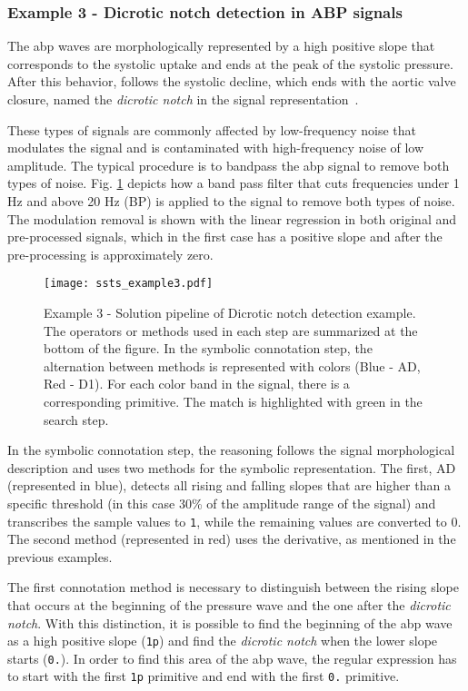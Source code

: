 \subsubsection{Example 3 - Dicrotic notch detection in ABP signals}

The \gls{abp} waves are morphologically represented by a high positive slope that corresponds to the systolic uptake and ends at the peak of the systolic pressure. After this behavior, follows the systolic decline, which ends with the aortic valve closure, named the \textit{dicrotic notch} in the signal representation~\cite{abpSignal}.
\par
These types of signals are commonly affected by low-frequency noise that modulates the signal and is contaminated with high-frequency noise of low amplitude. The typical procedure is to bandpass the \gls{abp} signal to remove both types of noise. Fig. \ref{fig:Exercise3} depicts how a band pass filter that cuts frequencies under 1 Hz and above 20 Hz (BP) is applied to the signal to remove both types of noise. The modulation removal is shown with the linear regression in both original and pre-processed signals, which in the first case has a positive slope and after the pre-processing is approximately zero.

\begin{figure}
  \centering
      \texttt{[image: ssts\_example3.pdf]}
  \caption{Example 3 - Solution pipeline of Dicrotic notch detection example. The operators or methods used in each step are summarized at the bottom of the figure. In the symbolic connotation step, the alternation between methods is represented with colors (Blue - AD, Red - D1). For each color band in the signal, there is a corresponding primitive. The match is highlighted with green in the search step.}
  \label{fig:Exercise3}
\end{figure}

In the symbolic connotation step, the reasoning follows the signal morphological description and uses two methods for the symbolic representation. The first, AD (represented in blue), detects all rising and falling slopes that are higher than a specific threshold (in this case 30\% of the amplitude range of the signal) and transcribes the sample values to \texttt{1}, while the remaining values are converted to $0$. The second method (represented in red) uses the derivative, as mentioned in the previous examples.
\par
The first connotation method is necessary to distinguish between the rising slope that occurs at the beginning of the pressure wave and the one after the \textit{dicrotic notch}. With this distinction, it is possible to find the beginning of the \gls{abp} wave as a high positive slope (\texttt{1p}) and find the \textit{dicrotic notch} when the lower slope starts (\texttt{0.}). In order to find this area of the \gls{abp} wave, the regular expression has to start with the first \texttt{1p} primitive and end with the first \texttt{0.} primitive. 

